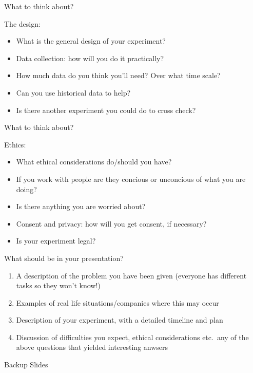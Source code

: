 \documentclass{beamer}
\begin{document}
\begin{frame}{What to think about?}

The design:

\begin{itemize}
\item What is the general design of your experiment?
\item Data collection: how will you do it practically?
\item How much data do you think you'll need?  Over what time scale?
\item Can you use historical data to help?
\item Is there another experiment you could do to cross check?
\end{itemize}

\end{frame}


\begin{frame}{What to think about?}

Ethics:

\begin{itemize}
\item What ethical considerations do/should you have?
\item If you work with people are they concious or unconcious of what you are doing?
\item Is there anything you are worried about?
\item Consent and privacy: how will you get consent, if necessary?
\item Is your experiment legal?

\end{itemize}


\end{frame}



\begin{frame}{What should be in your presentation?}

\begin{enumerate}
\item A description of the problem you have been given (everyone has different tasks so they won't know!)
\item Examples of real life situations/companies where this may occur
\item Description of your experiment, with a detailed timeline and plan
\item Discussion of difficulties you expect, ethical considerations etc.~any of the above questions that yielded interesting anwsers
\end{enumerate}


\end{frame}




\appendix
{}
\setcounter{finalframe}{\value{framenumber}}

\begin{frame}{Backup Slides}
\end{frame}




\setcounter{framenumber}{\value{finalframe}}
\end{document}
